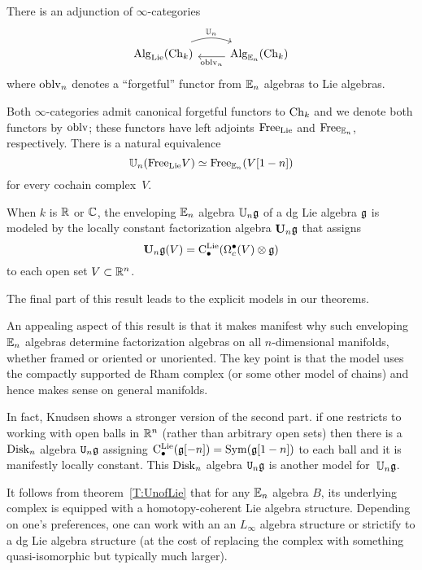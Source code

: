 \documentclass[11pt]{amsart}
\numberwithin{equation}{section}
\begin{document}
\begin{thm}\label{T:UnofLie}
There is an adjunction of $\infty$-categories
\[
\begin{tikzcd}
\Alg_\Lie(\Ch_k) \arrow[r, bend left=20, shift left=.5ex,"\UU_n"]  & \Alg_{\EE_n}(\Ch_k) \arrow[l, shift left=.5ex, "\oblv_n"]
\end{tikzcd}
\]
where ${\rm oblv}_n$ denotes a ``forgetful'' functor from $\mathbb E_n$ algebras to Lie algebras.

Both $\infty$-categories admit canonical forgetful functors to ${\rm Ch}_k$ and we denote both functors by ${\rm oblv}$;
these functors have left adjoints ${\rm Free}_{\rm Lie}$ and ${\rm Free}_{\mathbb E_n}$, respectively.
There is a natural equivalence
\[
\mathbb U_n ({\rm Free}_{\rm Lie} V) \simeq {\rm Free}_{\mathbb E_n}(V[1-n])
\]
for every cochain complex~$V$.

When $k$ is $\mathbb R$ or $\mathbb C$, 
the enveloping $\mathbb E_n$ algebra $\mathbb U_n \mathfrak g$ of a dg Lie algebra $\mathfrak g$ is modeled by the locally constant factorization algebra $\mathbf U_n \mathfrak g$ that assigns
\[
\mathbf U_n \mathfrak g(V) = {\rm C}^{\rm Lie}_\bullet(\Omega^\bullet_c(V) \otimes \mathfrak g)
\]
to each open set $V \subset \mathbb R^n$.
\end{thm}

The final part of this result leads to the explicit models in our theorems.

\begin{rmk}
An appealing aspect of this result is that it makes manifest why such enveloping $\mathbb E_n$ algebras determine factorization algebras on all $n$-dimensional manifolds, whether framed or oriented or unoriented.
The key point is that the model uses the compactly supported de Rham complex (or some other model of chains)
and hence makes sense on general manifolds.
\end{rmk}

In fact, Knudsen shows a stronger version of the second part.
if one restricts to working with open balls in $\mathbb R^n$ (rather than arbitrary open sets)
then there is a ${\rm Disk}_n$ algebra ${\tt U}_n \mathfrak g$ assigning ${\rm C}^{\rm Lie}_\bullet(\mathfrak g[-n]) = {\rm Sym}(\mathfrak g[1-n])$ to each ball and it is manifestly locally constant.
This ${\rm Disk}_n$ algebra ${\tt U}_n \mathfrak g$ is another model for~$\mathbb U_n \mathfrak g$.

\begin{rmk}
It follows from theorem~\ref{T:UnofLie} that for any $\mathbb E_n$ algebra $B$, 
its underlying complex is equipped with a homotopy-coherent Lie algebra structure.
Depending on one's preferences, one can work with an an $L_\infty$ algebra structure or strictify to a dg Lie algebra structure (at the cost of replacing the complex with something quasi-isomorphic but typically much larger).
\end{rmk}
\end{document}
